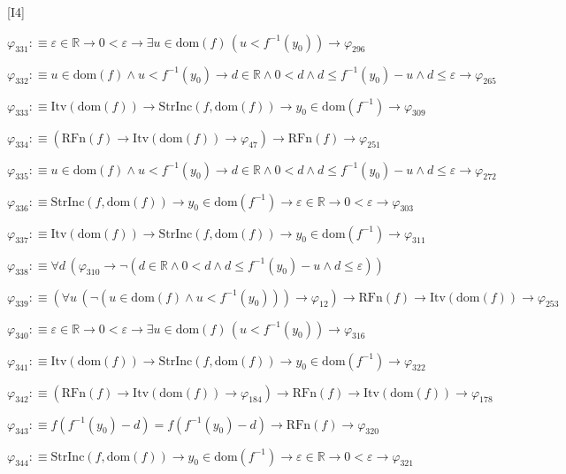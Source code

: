 \begin{fullproof}{[I4]}
\begin{abbrevlist}
\item $\varphi_{331} :\equiv \varepsilon \in \mathbb{R} \to 0 < \varepsilon \to \exists u \in \mathrm{dom}(f)\,(u < f^{-1}(y_{0})) \to \varphi_{296}$
\item $\varphi_{332} :\equiv u \in \mathrm{dom}(f) \land u < f^{-1}(y_{0}) \to d \in \mathbb{R} \land 0 < d \land d \leq f^{-1}(y_{0}) - u \land d \leq \varepsilon \to \varphi_{265}$
\item $\varphi_{333} :\equiv \mathrm{Itv}(\mathrm{dom}(f)) \to \mathrm{StrInc}(f,\mathrm{dom}(f)) \to y_{0} \in \mathrm{dom}(f^{-1}) \to \varphi_{309}$
\item $\varphi_{334} :\equiv (\mathrm{RFn}(f) \to \mathrm{Itv}(\mathrm{dom}(f)) \to \varphi_{47}) \to \mathrm{RFn}(f) \to \varphi_{251}$
\item $\varphi_{335} :\equiv u \in \mathrm{dom}(f) \land u < f^{-1}(y_{0}) \to d \in \mathbb{R} \land 0 < d \land d \leq f^{-1}(y_{0}) - u \land d \leq \varepsilon \to \varphi_{272}$
\item $\varphi_{336} :\equiv \mathrm{StrInc}(f,\mathrm{dom}(f)) \to y_{0} \in \mathrm{dom}(f^{-1}) \to \varepsilon \in \mathbb{R} \to 0 < \varepsilon \to \varphi_{303}$
\item $\varphi_{337} :\equiv \mathrm{Itv}(\mathrm{dom}(f)) \to \mathrm{StrInc}(f,\mathrm{dom}(f)) \to y_{0} \in \mathrm{dom}(f^{-1}) \to \varphi_{311}$
\item $\varphi_{338} :\equiv \forall d\,(\varphi_{310} \to \neg (d \in \mathbb{R} \land 0 < d \land d \leq f^{-1}(y_{0}) - u \land d \leq \varepsilon))$
\item $\varphi_{339} :\equiv (\forall u\,(\neg (u \in \mathrm{dom}(f) \land u < f^{-1}(y_{0}))) \to \varphi_{12}) \to \mathrm{RFn}(f) \to \mathrm{Itv}(\mathrm{dom}(f)) \to \varphi_{253}$
\item $\varphi_{340} :\equiv \varepsilon \in \mathbb{R} \to 0 < \varepsilon \to \exists u \in \mathrm{dom}(f)\,(u < f^{-1}(y_{0})) \to \varphi_{316}$
\item $\varphi_{341} :\equiv \mathrm{Itv}(\mathrm{dom}(f)) \to \mathrm{StrInc}(f,\mathrm{dom}(f)) \to y_{0} \in \mathrm{dom}(f^{-1}) \to \varphi_{322}$
\item $\varphi_{342} :\equiv (\mathrm{RFn}(f) \to \mathrm{Itv}(\mathrm{dom}(f)) \to \varphi_{184}) \to \mathrm{RFn}(f) \to \mathrm{Itv}(\mathrm{dom}(f)) \to \varphi_{178}$
\item $\varphi_{343} :\equiv f(f^{-1}(y_{0}) - d) = f(f^{-1}(y_{0}) - d) \to \mathrm{RFn}(f) \to \varphi_{320}$
\item $\varphi_{344} :\equiv \mathrm{StrInc}(f,\mathrm{dom}(f)) \to y_{0} \in \mathrm{dom}(f^{-1}) \to \varepsilon \in \mathbb{R} \to 0 < \varepsilon \to \varphi_{321}$

\end{abbrevlist}
\end{fullproof}
